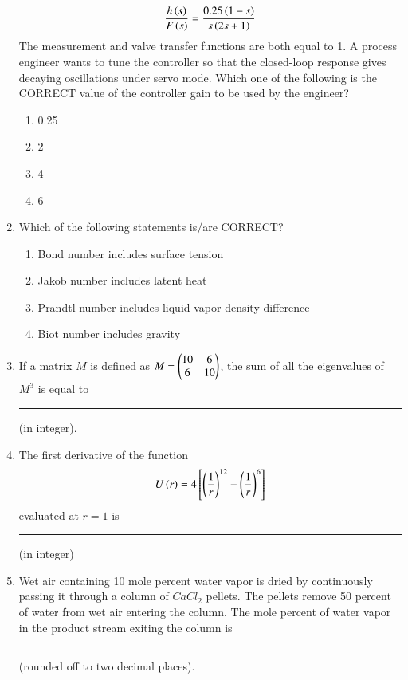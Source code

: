 \documentclass[journal,12pt,onecolumn]{IEEEtran}
\theoremstyle{remark}
\begin{document}
\begin{enumerate}
    \begin{align*}
        \frac{h\left(s\right)}{F\left(s\right)} = \frac{0.25\left(1-s\right)}{s\left(2s+1\right)}  
    \end{align*}
    The measurement and valve transfer functions are both equal to 1. A process engineer wants to tune the controller so that the closed-loop response gives decaying oscillations under servo mode. Which one of the following is the CORRECT value of the controller gain to be used by the engineer?

    \hfill{}
    \begin{enumerate}
        \item 0.25
        \item 2
        \item 4
        \item 6
    \end{enumerate}
    
    \item Which of the following statements is/are CORRECT?

    \hfill{}
    \begin{enumerate}
        \item Bond number includes surface tension
        \item Jakob number includes latent heat
        \item Prandtl number includes liquid-vapor density difference
        \item Biot number includes gravity
    \end{enumerate}

    \item If a matrix $M$ is defined as $M =\begin{pmatrix}
    10 & 6 \\
    6 & 10 \\
    \end{pmatrix}$, the sum of all the eigenvalues of $M^3$ is
equal to \rule{40pt}{0.1mm} (in integer).

    \hfill{}
    \item The first derivative of the function
    \begin{align*}
        U\left(r\right) = 4{}\left[\left(\frac{1}{r}\right)^{12} - \left(\frac{1}{r}\right)^{6}\right] 
    \end{align*}
    evaluated at $r=1$ is \rule{40pt}{0.1mm} (in integer)

\hfill{}
    \item Wet air containing 10 mole percent water vapor is dried by continuously passing it through a column of $CaCl_2$ pellets. The pellets remove 50 percent of water from wet air entering the column. The mole percent of water vapor in the product stream exiting the column is \rule{40pt}{0.1mm}(rounded off to two decimal places).


\end{enumerate}
\end{document}
